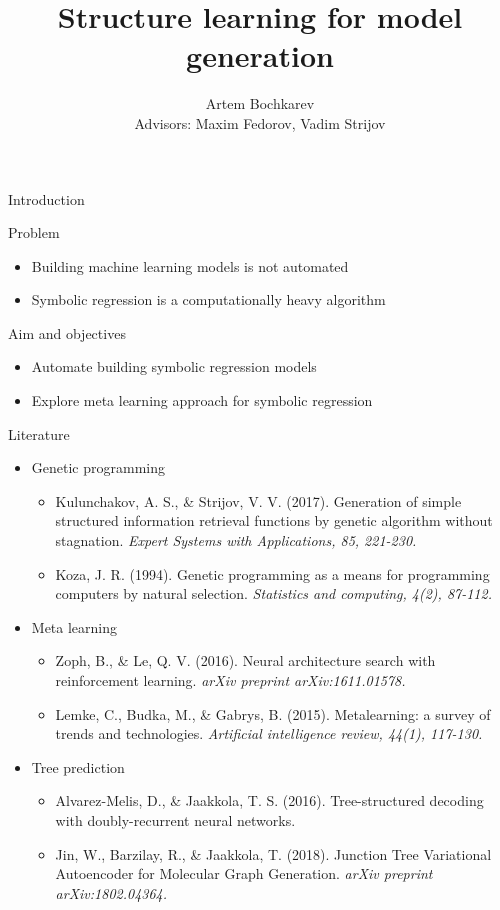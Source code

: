 \documentclass{beamer}
\title[Structure learning\hspace{25mm} \insertframenumber/\inserttotalframenumber]{Structure learning for model generation}
\author[Bochkarev A.]{Artem Bochkarev\\
Advisors: Maxim Fedorov, Vadim Strijov}
\date{}
\institute[Skoltech, MIPT]{Skolkovo Institute of Science and Technology\\
	Moscow Institute of Physics and Technology
    \vspace{0.3cm}
}
\date{}
\begin{document}
\begin{frame}
  \titlepage
\end{frame}


\begin{frame}{Introduction}
\begin{block}{Problem}
	\begin{itemize}
		\item Building machine learning models is not automated
		\item Symbolic regression is a computationally heavy algorithm
	\end{itemize}
\end{block}

\begin{block}{Aim and objectives}
	\begin{itemize}
		\item Automate building symbolic regression models
		\item Explore meta learning approach for symbolic regression
	\end{itemize}
\end{block}
\end{frame}

\begin{frame}{Literature}
\begin{itemize}
	\item Genetic programming \begin{itemize}
		\item Kulunchakov, A. S., \& Strijov, V. V. (2017). Generation of simple structured information retrieval functions by genetic algorithm without stagnation. \textit{Expert Systems with Applications, 85, 221-230.}
		\item Koza, J. R. (1994). Genetic programming as a means for programming computers by natural selection. \textit{Statistics and computing, 4(2), 87-112.}
	\end{itemize}

	\item Meta learning \begin{itemize}
		\item Zoph, B., \& Le, Q. V. (2016). Neural architecture search with reinforcement learning. \textit{arXiv preprint arXiv:1611.01578.}
		\item Lemke, C., Budka, M., \& Gabrys, B. (2015). Metalearning: a survey of trends and technologies. \textit{Artificial intelligence review, 44(1), 117-130.}
	\end{itemize}

	\item Tree prediction \begin{itemize}
	\item Alvarez-Melis, D., \& Jaakkola, T. S. (2016). Tree-structured decoding with doubly-recurrent neural networks.
	\item Jin, W., Barzilay, R., \& Jaakkola, T. (2018). Junction Tree Variational Autoencoder for Molecular Graph Generation. \textit{arXiv preprint arXiv:1802.04364.}
	\end{itemize}
\end{itemize}
\end{frame}
\end{document}
